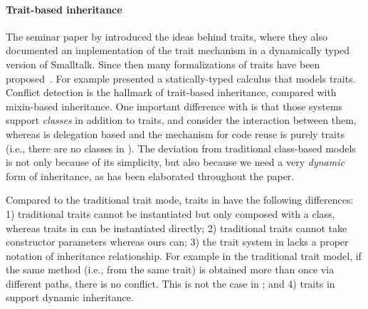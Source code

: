 \paragraph{Trait-based inheritance}

The seminar paper by \citet{scharli2003traits} introduced the ideas behind
traits, where they also documented an implementation of the trait
mechanism in a dynamically typed version of Smalltalk. Since then many
formalizations of traits have been
proposed~\cite{scharli2003traitsformal,ducasse2006traits,bettini2010prototypical}.
For example \citet{fisher2004typed} presented a statically-typed calculus that
models traits. Conflict detection is the hallmark of trait-based
inheritance, compared with mixin-based inheritance. One important difference
with \name is that those systems support \textit{classes} in addition to traits,
and consider the interaction between them, whereas \name is 
delegation based and the mechanism for code reuse is purely traits
(i.e., there are no classes in \name). The
deviation from traditional class-based models is not only because of its
simplicity, but also because we need a very \textit{dynamic} form of
inheritance, as has been elaborated throughout the paper.

Compared to the traditional trait mode, traits in \name have the following
differences: 1) traditional traits cannot be instantiated but only composed with
a class, whereas traits in \name can be instantiated directly; 2) traditional
traits cannot take constructor parameters whereas ours can; 3) the trait system
in \name lacks a proper notation of inheritance relationship. For example in the
traditional trait model, if the same method (i.e., from the same trait) is
obtained more than once via different paths, there is no conflict. This is not
the case in \name; and 4) traits in \name support dynamic
inheritance. 





